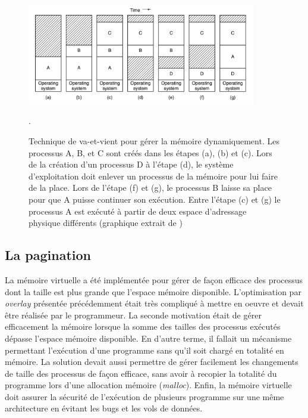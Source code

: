 \begin{figure}
    \center
    \includegraphics[width=10cm]{images/memory_swapping.png}
    \caption{\label{pic:memory_swapping} Technique de va-et-vient pour gérer la mémoire dynamiquement. Les processus A, B, et C sont créés dans les étapes (a), (b) et (c). Lors de la création d'un processus D à l'étape (d), le système d'exploitation doit enlever un processus de la mémoire pour lui faire de la place. Lors de l'étape (f) et (g), le processus B laisse sa place pour que A puisse continuer son exécution. Entre l'étape (c) et (g) le processus A est exécuté à partir de deux espace d'adressage physique différents (graphique extrait de \cite{tanenbaum2008systeme})}.
\end{figure}





\subsection{La pagination} \label{sec:page}


La mémoire virtuelle a été implémentée pour gérer de façon efficace des processus dont la taille est plus grande que l'espace mémoire disponible. L'optimisation par \textit{overlay} présentée précédemment était très compliqué à mettre en oeuvre et devait être réalisée par le programmeur. La seconde motivation était de gérer efficacement la mémoire lorsque la somme des tailles des processus exécutés dépasse l'espace mémoire disponible. En d'autre terme, il fallait un mécanisme permettant l'exécution d'une programme sans qu'il soit chargé en totalité en mémoire. La solution devait aussi permettre de gérer facilement les changements de taille des processus de façon efficace, sans avoir à recopier la totalité du programme lors d'une allocation mémoire (\textit{malloc}). Enfin, la mémoire virtuelle doit assurer la sécurité de l'exécution de plusieurs programme sur une même architecture en évitant les bugs et les vols de données.


